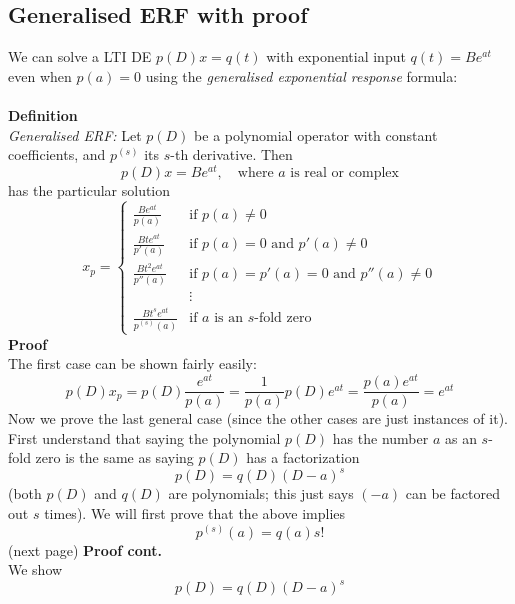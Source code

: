 \documentclass{report}
\begin{document}
\subsection{Generalised ERF with proof}
We can solve a LTI DE $p(D)x=q(t)$ with exponential input 
$q(t)=Be^{at}$ even when $p(a)=0$ using the \textit{generalised exponential response} formula:\\
\vspace{1mm}\\
\textbf{Definition}\\
\textit{Generalised ERF:} Let $p(D)$ be a polynomial operator with constant coefficients, and $p^{(s)}$
its $s$-th derivative. Then
\begin{equation*}
p(D)x=Be^{at},\quad\text{where $a$ is real or complex}
\end{equation*}
has the particular solution 
\begin{equation*}
x_p=\begin{cases}
\frac{Be^{at}}{p(a)}&\text{if }p(a)\neq0\\
\frac{Bte^{at}}{p'(a)}&\text{if }p(a)=0\text{ and }p'(a)\neq0\\
\frac{Bt^2e^{at}}{p''(a)}&\text{if }p(a)=p'(a)=0\text{ and }p''(a)\neq0\\
&\vdots\\
\frac{Bt^se^{at}}{p^{(s)}(a)}&\text{if $a$ is an $s$-fold zero}
\end{cases}
\end{equation*}
\textbf{Proof}\\
The first case can be shown fairly easily:
\begin{equation*}
p(D)x_p=p(D)\frac{e^{at}}{p(a)}=\frac{1}{p(a)}p(D)e^{at}
=\frac{p(a)e^{at}}{p(a)}=e^{at}
\end{equation*}
Now we prove the last general case (since the other cases are just instances of it). First understand
that saying the polynomial $p(D)$ has the number $a$ as an $s$-fold zero is the same as saying $p(D)$ has 
a factorization
\begin{equation*}
p(D)=q(D)(D-a)^s
\end{equation*}
(both $p(D)$ and $q(D)$ are polynomials; this just says $(-a)$ can be factored out $s$ times). We will first prove
that the above implies
\begin{equation*}
p^{(s)}(a)=q(a)s!
\end{equation*}
(next page)
\newpage
\noindent\textbf{Proof cont.}\\
We show
\begin{equation*}
p(D)=q(D)(D-a)^s
\end{equation*}
\end{document}
